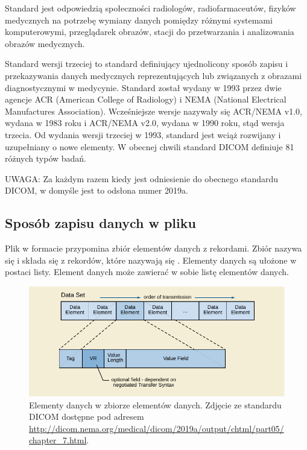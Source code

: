 \label{sec:dicom}

\par
Standard \DICOM jest odpowiedzią społeczności radiologów, radiofarmaceutów, fizyków medycznych na potrzebę wymiany danych pomiędzy różnymi systemami komputerowymi, przeglądarek obrazów,  stacji do przetwarzania i analizowania obrazów medycznych.

\par
Standard \DICOM wersji trzeciej to standard definiujący ujednolicony sposób zapisu i przekazywania danych medycznych reprezentujących lub związanych z obrazami diagnostycznymi w medycynie.
Standard został wydany w 1993 przez dwie agencje ACR (American College of Radiology) i NEMA (National Electrical Manufactures Association).
Wcześniejsze wersje nazywały się ACR/NEMA v1.0, wydana w 1983 roku i ACR/NEMA v2.0, wydana w 1990 roku, stąd wersja trzecia.
Od wydania wersji trzeciej w 1993, standard jest wciąż rozwijany i uzupełniany o nowe elementy.
W obecnej chwili standard DICOM definiuje 81 różnych typów badań.

UWAGA: Za każdym razem kiedy jest odniesienie do obecnego standardu DICOM, w domyśle jest to odsłona numer 2019a.

\subsection{Sposób zapisu danych w pliku \DICOM}

\par
Plik w formacie \DICOM przypomina zbiór elementów danych z rekordami.
Zbiór nazywa się  i składa się z rekordów, które nazywają się .
Elementy danych są ułożone w postaci listy.
Element danych może zawierać w sobie listę elementów danych.

\begin{figure}[!htbp]
    \centering
    \includegraphics[]{img/dicom-dataelement001.pdf}
    \caption{Elementy danych w zbiorze elementów danych. Zdjęcie ze standardu DICOM dostępne pod adresem \url{http://dicom.nema.org/medical/dicom/2019a/output/chtml/part05/chapter_7.html}.}
    \label{fig:dicom-dataelement}
\end{figure}


